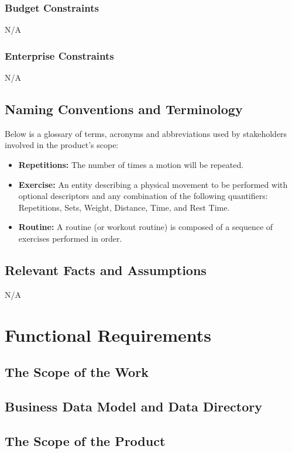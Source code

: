 \documentclass[12pt]{article}
\begin{document}
\subsubsection{Budget Constraints}
N/A
\subsubsection{Enterprise Constraints}
N/A

\subsection{Naming Conventions and Terminology}
Below is a glossary of terms, acronyms and abbreviations used by stakeholders involved in the product's scope:
\begin{itemize}
	\item \textbf{Repetitions: } The number of times a motion will be repeated.
	\item \textbf{Exercise: } An entity describing a physical movement to be performed with optional descriptors and any combination of the following quantifiers: Repetitions, Sets, Weight, Distance, Time, and Rest Time. 
	\item \textbf{Routine: } A routine (or workout routine) is composed of a sequence of exercises performed in order.
\end{itemize}
\subsection{Relevant Facts and Assumptions}
N/A
\section{Functional Requirements}
\subsection{The Scope of the Work}
\subsection{Business Data Model and Data Directory}
\subsection{The Scope of the Product}
\end{document}
